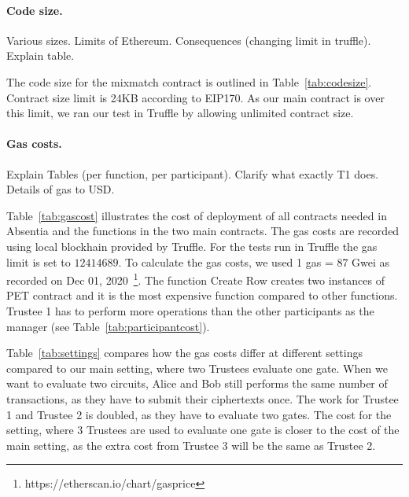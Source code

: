 


\paragraph{Code size.} Various sizes. Limits of Ethereum. Consequences (changing limit in truffle). Explain table.

The code size for the mixmatch contract is outlined in Table~\ref{tab:codesize}. Contract size limit is 24KB according to EIP170. As our main contract is over this limit, we ran our test in Truffle by allowing unlimited contract size.



 





\paragraph{Gas costs.} Explain Tables (per function, per participant). Clarify what exactly T1 does. Details of gas to USD.

Table~\ref{tab:gascost} illustrates the cost of deployment of all contracts needed in Absentia and the functions in the two main contracts. The gas costs are recorded using local blockhain provided by Truffle. For the tests run in Truffle the gas limit is set to $12414689$. To calculate the gas costs, we used 1 gas = 87 Gwei as recorded on Dec 01, 2020~\footnote{https://etherscan.io/chart/gasprice}. The function Create Row creates two instances of PET contract and it is the most expensive function compared to other functions. Trustee 1 has to perform more operations than the other participants as the manager (see Table~\ref{tab:participantcost}).

Table~\ref{tab:settings} compares how the gas costs differ at different settings compared to our main setting, where two Trustees evaluate one gate. When we want to evaluate two circuits, Alice and Bob still performs the same number of transactions, as they have to submit their ciphertexts once. The work for Trustee 1 and Trustee 2 is doubled, as they have to evaluate two gates. The cost for the setting, where 3 Trustees are used to evaluate one gate is closer to the cost of the main setting, as the extra cost from Trustee 3 will be the same as Trustee 2.


